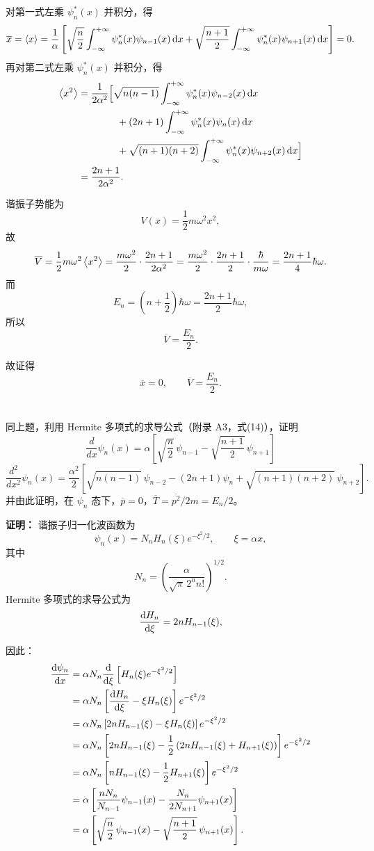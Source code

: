 \documentclass[10pt,a4paper]{article}
\begin{document}
对第一式左乘 \(\psi_n^*(x)\) 并积分，得
\[
\overline{x}=\ev{x}
=
\frac{1}{\alpha}\left[
\sqrt{\frac{n}{2}}\int_{-\infty}^{+\infty}\psi_n^*(x)\psi_{n-1}(x)\, \dd x
+
\sqrt{\frac{n+1}{2}}\int_{-\infty}^{+\infty}\psi_n^*(x)\psi_{n+1}(x)\, \dd x
\right]
=0.
\]
再对第二式左乘 \(\psi_n^*(x)\) 并积分，得
\begin{align*}
\ev{x^2}
&=
\frac{1}{2\alpha^2}\Bigl[
\sqrt{n(n-1)}\int_{-\infty}^{+\infty}\psi_n^*(x)\psi_{n-2}(x)\,\dd x \\
&\qquad\qquad
+ (2n+1)\int_{-\infty}^{+\infty}\psi_n^*(x)\psi_n(x)\,\dd x \\
&\qquad\qquad
+ \sqrt{(n+1)(n+2)}\int_{-\infty}^{+\infty}\psi_n^*(x)\psi_{n+2}(x)\,\dd x
\Bigr] \\
&= \frac{2n+1}{2\alpha^2}.
\end{align*}

谐振子势能为
\[
V(x)=\frac{1}{2}m\omega^2x^2,
\]
故
\[
\overline{V}=\frac{1}{2}m\omega^2\ev{x^2}
=\frac{m\omega^2}{2}\cdot\frac{2n+1}{2\alpha^2}
=\frac{m\omega^2}{2}\cdot\frac{2n+1}{2}\cdot\frac{\hbar}{m\omega}
=\frac{2n+1}{4}\hbar\omega.
\]
而
\[
E_n=\left(n+\frac{1}{2}\right)\hbar\omega=\frac{2n+1}{2}\hbar\omega,
\]
所以
\[
\overline{V}=\frac{E_n}{2}.
\]

故证得
\[
\overline{x}=0,
\qquad
\overline{V}=\frac{E_n}{2}.
\]

\section{}
同上题，利用 Hermite 多项式的求导公式（附录 A3，式(14)），证明
\[
\frac{d}{dx}\psi_n(x)=\alpha\left[\sqrt{\frac{n}{2}}\,\psi_{n-1}-\sqrt{\frac{n+1}{2}}\,\psi_{n+1}\right]
\]
\[
\frac{d^2}{dx^2}\psi_n(x)=\frac{\alpha^2}{2}\left[\sqrt{n(n-1)}\,\psi_{n-2}-(2n+1)\psi_n+\sqrt{(n+1)(n+2)}\,\psi_{n+2}\right].
\]
并由此证明，在 $\psi_n$ 态下，$\overline{p}=0$，$\overline{T}=\overline{p^2}/2m=E_n/2$。

\vspace{0.5cm}

\noindent\textbf{证明：}
谐振子归一化波函数为
\[
\psi_n(x)=N_n H_n(\xi)e^{-\xi^2/2},
\qquad
\xi=\alpha x,
\]
其中
\[
N_n=\left(\frac{\alpha}{\sqrt{\pi}\,2^n n!}\right)^{1/2}.
\]
Hermite 多项式的求导公式为
\[
\dv{H_n}{\xi}=2nH_{n-1}(\xi),
\]

因此：
\begin{align*}
\dv{\psi_n}{x}
&=\alpha N_n \dv{\xi}\left[ H_n(\xi)e^{-\xi^2/2} \right] \\
&=\alpha N_n \left[ \dv{H_n}{\xi}-\xi H_n(\xi) \right] e^{-\xi^2/2} \\
&=\alpha N_n \left[ 2nH_{n-1}(\xi)-\xi H_n(\xi) \right] e^{-\xi^2/2} \\
&=\alpha N_n \left[ 2nH_{n-1}(\xi)-\frac{1}{2}\left( 2nH_{n-1}(\xi)+H_{n+1}(\xi) \right) \right] e^{-\xi^2/2} \\
&=\alpha N_n \left[ nH_{n-1}(\xi)-\frac{1}{2}H_{n+1}(\xi) \right] e^{-\xi^2/2} \\
&=\alpha\left[ \frac{nN_n}{N_{n-1}}\psi_{n-1}(x)-\frac{N_n}{2N_{n+1}}\psi_{n+1}(x) \right] \\
&=\alpha\left[ \sqrt{\frac{n}{2}}\,\psi_{n-1}(x)-\sqrt{\frac{n+1}{2}}\,\psi_{n+1}(x) \right].
\end{align*}
\end{document}
